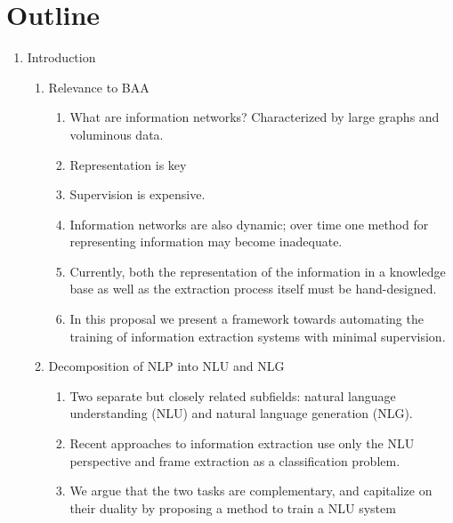 \documentclass[11pt]{article}
\newcommand\set[1]{\left\{#1\right\}}
\newcommand{\bc}{\mathbf{c}}
\newcommand{\be}{\mathbf{e}}
\newcommand{\br}{\mathbf{r}}
\newcommand{\bt}{\mathbf{t}}
\newcommand{\bv}{\mathbf{v}}
\newcommand{\bx}{\mathbf{x}}
\newcommand{\by}{\mathbf{y}}
\newcommand{\bz}{\mathbf{z}}
\begin{document}
\begin{comment}
For task (\textsc{align}), we have the fully observed summary $\by$,
the unobserved content plan $\bz=\bc$, and all records as conditioning $\bx=\br$.
For task (\textsc{values}), we again have the observed summary $\by$,
but we pretend the values are unobserved $\bz=\set{\bc,\bv}$, and
use the rest of the records as conditioning $\bx=\set{\be,\bt}$.
(TODO: functions)
\end{comment}

\newpage

\section*{Outline}
\begin{enumerate}
\item Introduction
    \begin{enumerate}
    \item Relevance to BAA
        \begin{enumerate}
        \item What are information networks? Characterized by large graphs and voluminous data.
        \item Representation is key
        \item Supervision is expensive.
        \item Information networks are also dynamic;
            over time one method for representing information may become inadequate.
        \item Currently, both the representation of the information in a knowledge base
            as well as the extraction process itself must be hand-designed.
        \item In this proposal we present a framework towards automating the
            training of information extraction systems with minimal supervision.
        \end{enumerate}
    \item Decomposition of NLP into NLU and NLG
        \begin{enumerate}
        \item Two separate but closely related subfields: natural language understanding (NLU) and natural language
            generation (NLG).
        \item Recent approaches to information extraction use only the NLU perspective
            and frame extraction as a classification problem.
        \item We argue that the two tasks are complementary,
            and capitalize on their duality by proposing a method to train a NLU system

\end{enumerate}
\end{enumerate}
\end{enumerate}
\end{document}
